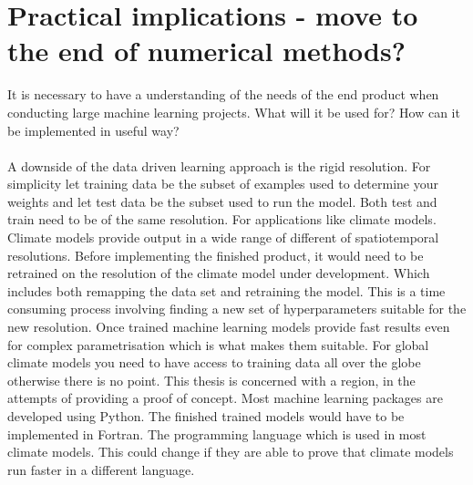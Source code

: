 
\section{Practical implications - move to the end of numerical methods?} \label{sec:practical_implications}
It is necessary to have a understanding of the needs of the end product when conducting large machine learning projects. What will it be used for? How can it be implemented in useful way?
\\ \\
A downside of the data driven learning approach is the rigid resolution. For simplicity let training data be the subset of examples used to determine your weights and let test data be the subset used to run the model. Both test and train need to be of the same resolution. For applications like climate models. Climate models provide output in a wide range of different of spatiotemporal resolutions. Before implementing the finished product, it would need to be retrained on the resolution of the climate model under development. Which includes both remapping the data set and retraining the model. This is a time consuming process involving finding a new set of hyperparameters suitable for the new resolution. %
Once trained machine learning models provide fast results even for complex parametrisation which is what makes them suitable. For global climate models you need to have access to training data all over the globe otherwise there is no point. This thesis is concerned with a region, in the attempts of providing a proof of concept. %
Most machine learning packages are developed using Python. The finished trained models would have to be implemented in Fortran. The programming language which is used in most climate models. This could change if they are able to prove that climate models run faster in a different language.
